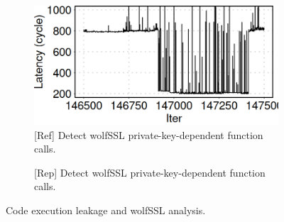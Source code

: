 \begin{figure}[ht]
    \centering
    \begin{subfigure}[t]{.24\linewidth}
        \centering
        \includegraphics[width=\linewidth]{figure/plot/reference/fig15-fp-exptmod.png}
        \caption{[Ref] Detect wolfSSL private-key-dependent function calls.}
        \label{fig:15:ref:shared-lib-wolfssl-fp-exptmod}
    \end{subfigure}
    \hfill
    \begin{subfigure}[t]{.24\linewidth}
        \centering
        \caption{[Rep] Detect wolfSSL private-key-dependent function calls.}
        \label{fig:15:rep:shared-lib-wolfssl-fp-exptmod}
    \end{subfigure}
    \caption{Code execution leakage and wolfSSL analysis.}
    \label{fig:15:code-execution-leak}
\end{figure}
